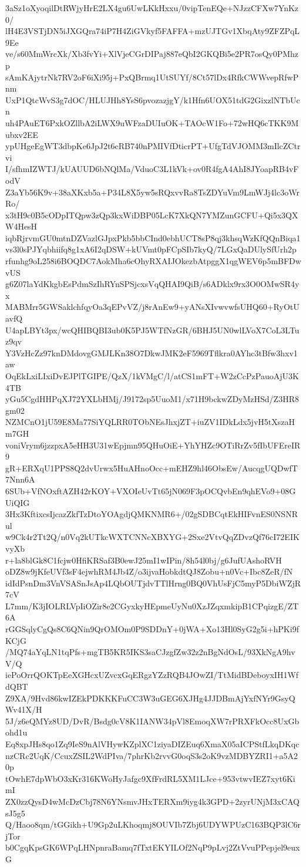 3aSz1oXyoqilDtRWjyHrE2LX4gu6UwLKkHxxu/0vipTenEQe+NJzzCFXw7YnKz0/
lH4E3VSTjDN5iJXGQra74iP7H4ZiGVkyf5FAFFA+mzUJTGv1XbqAty9ZFZPqL9Ee
ve/s60MmWrcXk/Xb3fvYi+XlVjeCGrDIPaj887eQbI2GKQBi5e2PR7osQy0PMhzp
sAmKAjytrNk7RV2oF6iXi95j+PxQBrmq1UtSUYf/8Ct57lDx4RfkCWWvepRfwPnm
UxP1QtcWvS3g7dOC/HLUJHh8YsS6pvozazjgY/k1Hfn6UOX51tdG2GixzlNTbUcn
uh4PAuET6PxkOZllbA2iLWX9uWFzaDUIuOK+TAOcW1Fo+72wHQ6cTKK9Mubxv2EE
ypUHgeEgWT3dbpKe6JpJ2t6cRB740nPMIVfDticrPT+UfgTdVJOMM3mIlcZCtrvi
I/sfhmIZWTJ/kUAUUD6bNQlMa/VduoC3L1kVk+ov0R4fgA4AhI8JYoapRB4vFodV
Z3aYb56K9v+38aXKxb5a+P34L8X5yw5sRQxvvRa8TsZDYuVm9LmWJj4lc3oWrRo/
x3tH9c0B5cODpITQpw3zQp3kxWiDBP05LcK7XkQN7YMZunGCFU+Qi5x3QXW4HesH
iqbRjrvmGU0mtnDZVazlGJpxPkb5bbCInd0ebhUCT8sP8qj3khsqWzKfQQnBiqa1
vs3l0sPJYqbhiifq8g1xA6I2qDSW+kUVmt0pFCpSIb7kyQ/7LGxQaDUlySfUrh2p
rfunhg9oL258i6BOQDC7AokMha6cOhyRXAIJOkezbAtpggX1qgWEV6p5mBFDwvUS
g6Z07laYdKkgbEsPdmSzIhRYnSPSjcxsVqQHAI9QiB/s6ADklx9rx3O0OMwSR4yx
MABMrr5GWSaklchfqyOa3qEPvVZ/j8rAnEw9+yANsXIvwvwfsUHQ60+RyOtUavfQ
U4apLBYt3px/wcQHIBQBI3ub0K5PJ5WTfNzGR/6BHJ5UN0wlLVoX7CoL3LTuz9qv
Y3VzHcZz97knDMdovgGMJLKn38O7DkwJMK2eF5969Tflkra0AYhc3tBfw3hxv1aw
OqEkLxiLIxiDvEJPlTGIPE/QzX/1kVMgC/l/atCS1mFT+W2zCcPzPauoAjU3K4TB
yGu5CgdHHPqXJ72YXLbHMj/J9172sp5UuoM1/x71H9bckwZDyMzHSd/Z3HR8gm02
NZMCnO1jU59E8Ma77SiYQLRR0TObNEsJhxjZT+iuZV1IDkLdx5jvH5tXszaHm7GH
voniVrym6jzzpxA5eHH3U31wEpjmn95QHuOiE+YhYHZc9OTiRrZv5fIbUFEreIR9
gR+ERXqU1PPS8Q2dvUrwx5HuAHnoOcc+mEHZ9hl46ObsEw/AucqgUQDwfT7Nnn6A
6SUb+VfNOxftAZH42rKOY+VXOIeUvTt65jN069F3pOCQvbEn9qhEVo9+08GUiQIG
3Hx3KftixcsIjcazZkfTzDtoYOAgdjQMKNMR6+/02gSDBCqtEkHIFvnES0NSNRul
w9Ck4r2Tt2Q/n0Vq2kUTkcWXTCNNcXBXYG+2Sxe2VtvQqZDvzQf76cI72EIKvyXb
r+la8blGk8C1fcjw0HfiKRSaf3B0ewJ25mI1wIPin/8h54l0bj/g6JufUAshoRVH
oDZ8w9jKfeUVf3sF4ejwhRM4Jb4Z/o3ijvaHobkdtQJ8Zobu+n0Vc+Ibc8ZeR/fN
idIdPsnDm3VnVSASnJsAp4LQbOUTjdvTTlHrng0BQ0VhUsFjC5myP5DbiWZjR7cV
L7mm/K3jIOLRLVpIiOZir8e2CGyxkyHEpmeUyNu0XzJZqxmkipB1CPqizgE/ZT6A
rGGSqlyCgQs8C6QNin9QrOMOm0P9SDDnY+0jWA+Xo13Hl0SyG2g5i+hPKi9fKCjG
/MQ74aYqLN1tqPfs+mgTB5KR5IKS3saCJzgfZw32z2nBgNdOsL/93XkNgA9hvV/Q
iePoOrrQOKTpEeXGHcxUZvcxGqERgzYZzRQB4JOwZI/TtMidBDeboyxIH1WfdQBT
Z9XA/9Hvd86kwIZEkPDKKKFuCC3W3uGEG6XJHg4JJDBmAjYxfNYr9GsyQWv41X/H
5J/z6eQMYz8UD/DvR/Bsdg0cV8K1IANW34pVl8EmoqXW7rPRXFkOcc8UxGbohd1u
Eq8xpJHs8qo1Zq9IeS9nAlVHywKZplXC1ziyaDIZEuq6XmaX05aICPStfLkqDKqc
nzCRc2UqK/CcuxZSIL2WdPIva/7phrKb2rvvG0oqS3s2oK9vzMDBYZRI1+a5A20p
tOwhE7dpWbO3xKr316KWoHyJafgc9XfFrdRL5XM1LJce+953vtwvIEZ7xyt6KimI
ZX0zzQysD4wMcDzCbj78N6YNsmvJHxTERXm9iyg4k3GPD+2zyrUNjM3xCAQsJ5g5
Q/Haoo8qm/tGGikh+U9Gp2uLKhoqmj8OUVIb7Zbj6UDYWPUzC163BQP3lC6rjTor
b0CgqKpsGK6WPqLHNpnraBamq7fTxtEKYILOf2NqP9pLvj2ZtVvuPPepjel9euxG
